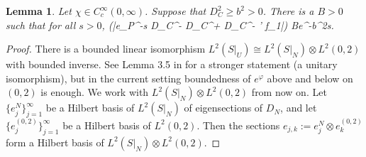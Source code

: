 \documentclass[11pt]{article}
\theoremstyle{plain}
\newtheorem{lemma}[theorem]{Lemma}
\theoremstyle{definition}
\theoremstyle{remark}
\numberwithin{equation}{section}
\DeclareMathOperator{\Tr}{Tr}
\begin{document}
\begin{lemma}\label{lem Trace exp}
Let $\chi \in C^{\infty}_c(0,\infty)$. Suppose that $D_C^2 \geq b^2>0$.
There is a   $B>0$ such that for all $s>0$,
\Tr(|\chi e_P^{-s D_C^- D_C^+} D_C^- \psi' f_1|) \leq Be^{-b^2s}.
\eeq
\end{lemma}
\begin{proof}
There is a bounded linear isomorphism $L^2(S|_U) \cong L^2(S|_N) \otimes L^2(0,2)$ with bounded inverse. See Lemma 3.5 in \cite{HW21b} %
for a stronger statement (a unitary isomorphism), but in the current setting boundedness of $e^{\varphi}$ above and below on $(0,2)$ is enough. We work with $L^2(S|_N) \otimes L^2(0,2)$ from now on. Let $\{e_j^N\}_{j=1}^{\infty}$ be a Hilbert basis of $L^2(S|_N)$ of eigensections of $D_N$, and let $\{e_j^{(0,2)}\}_{j=1}^{\infty}$ be a Hilbert basis of $L^2(0,2)$. Then the sections $e_{j, k} := e_j^N \otimes e_k^{(0,2)}$ form a Hilbert basis of $L^2(S|_N) \otimes L^2(0,2)$.


\end{proof}
\end{document}
